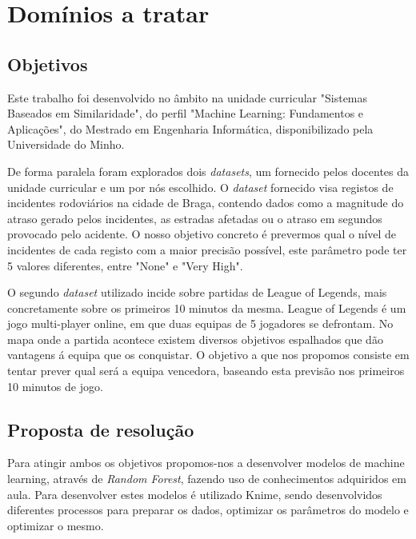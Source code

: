 \section{Domínios a tratar}
\subsection{Objetivos}
Este trabalho foi desenvolvido no âmbito na unidade curricular "Sistemas Baseados em Similaridade", do perfil "Machine Learning: Fundamentos e Aplicações", do Mestrado em Engenharia Informática, disponibilizado pela Universidade do Minho.

De forma paralela foram explorados dois \textit{datasets}, um fornecido pelos docentes da unidade curricular e um por nós escolhido. O \textit{dataset} fornecido visa registos de incidentes rodoviários na cidade de Braga, contendo dados como a magnitude do atraso gerado pelos incidentes, as estradas afetadas ou o atraso em segundos provocado pelo acidente. O nosso objetivo concreto é prevermos qual o nível de incidentes de cada registo com a maior precisão possível, este parâmetro pode ter 5 valores diferentes, entre "None" e "Very High".

O segundo \textit{dataset} utilizado incide sobre partidas de League of Legends, mais concretamente sobre os primeiros 10 minutos da mesma. League of Legends é um jogo multi-player online, em que duas equipas de 5 jogadores se defrontam. No mapa onde a partida acontece existem diversos objetivos espalhados que dão vantagens á equipa que os conquistar. O objetivo a que nos propomos consiste em tentar prever qual será a equipa vencedora, baseando esta previsão nos primeiros 10 minutos de jogo.

\subsection{Proposta de resolução}
Para atingir ambos os objetivos propomos-nos a desenvolver modelos de machine learning, através de \textit{Random Forest}, fazendo uso de conhecimentos adquiridos em aula. Para desenvolver estes modelos é utilizado Knime, sendo desenvolvidos diferentes processos para preparar os dados, optimizar os parâmetros do modelo e optimizar o mesmo.